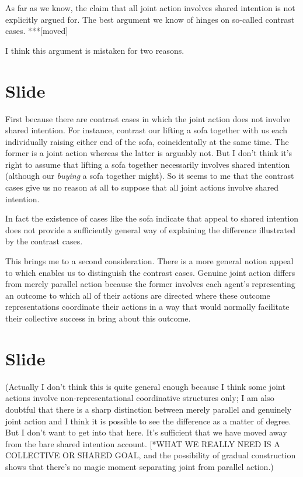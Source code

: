 \documentclass[12pt,\papersize]{extarticle}
\begin{document}
As far as we know, the claim that all joint action involves shared intention is not explicitly argued for.  
The best argument we know of hinges on so-called contrast cases.
***[moved]


I think this argument is mistaken for two reasons.


\section{Slide}
First because there are contrast cases in which the joint action does not involve shared intention.
For instance, contrast our lifting a sofa together with us each individually raising either end of the sofa, coincidentally at the same time.
The former is a joint action whereas the latter is arguably not.
But I don't think it's right to assume that lifting a sofa together necessarily involves shared intention (although our \emph{buying} a sofa together might).
So it seems to me that the contrast cases give us no reason at all to suppose that all joint actions involve shared intention.

In fact the existence of cases like the sofa indicate that appeal to shared intention does not provide a sufficiently general way of explaining the difference illustrated by the contrast cases.

This brings me to a second consideration.
There is a more general notion appeal to which enables us to distinguish the contrast cases.
Genuine joint action differs from merely parallel action because the former involves each agent’s representing an outcome to which all of their actions are directed where these outcome representations coordinate their actions in a way that would normally facilitate their collective success in bring about this outcome.



\section{Slide}
(Actually I don’t think this is quite general enough because I think some joint actions involve non-representational coordinative structures only; I am also doubtful that there is a sharp distinction between merely parallel and genuinely joint action and I think it is possible to see the difference as a matter of degree. But I don’t want to get into that here.  It’s sufficient that we have moved away from the bare shared intention account. [*WHAT WE REALLY NEED IS A COLLECTIVE OR SHARED GOAL, and the possibility of gradual construction shows that there’s no magic moment separating joint from parallel action.)
\end{document}
